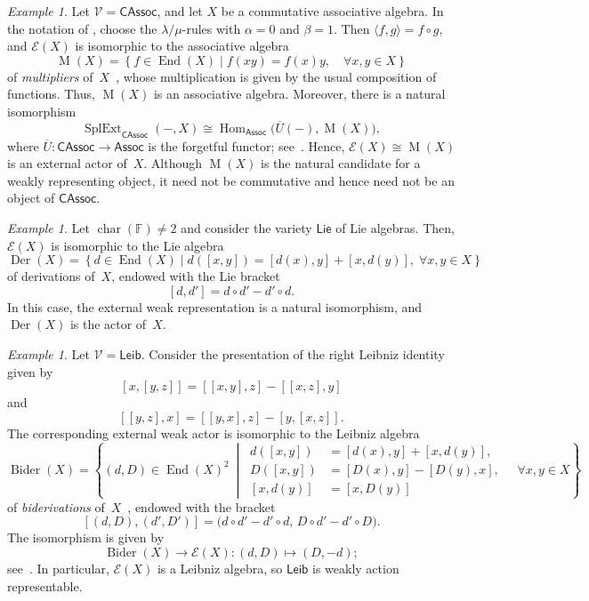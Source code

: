 \documentclass[reqno,a4paper]{amsart}
\theoremstyle{plain}
\theoremstyle{definition}
\theoremstyle{remark}
\newtheorem{example}[subsection]{Example}
\numberwithin{equation}{section}
\newcommand{\F}{\mathbb{F}}
\newcommand{\E}{\mathcal{E}}
\newcommand{\V}{\mathcal{V}}
\DeclareMathOperator{\bchar}{char}
\DeclareMathOperator{\Hom}{Hom}
\DeclareMathOperator{\SplExt}{SplExt}
\DeclareMathOperator{\End}{End}
\DeclareMathOperator{\Der}{Der}
\DeclareMathOperator{\Bider}{Bider}
\DeclareMathOperator{\M}{M}
\newcommand{\Assoc}{\ensuremath{\mathsf{Assoc}}}
\newcommand{\Lie}{\ensuremath{\mathsf{Lie}}}
\newcommand{\Leib}{\ensuremath{\mathsf{Leib}}}
\newcommand{\CAssoc}{\ensuremath{\mathsf{CAssoc}}}
\begin{document}
\begin{example}\label{ExampleExternalCAssoc}
Let $\V=\CAssoc$, and let $X$ be a commutative associative algebra. In the notation of , choose the $\lambda/\mu$-rules with $\alpha=0$ and $\beta=1$. Then $\langle f,g\rangle=f\circ g$, and $\E(X)$ is isomorphic to the associative algebra
\[
\operatorname{M}(X)
=
\left\{
f\in\End(X)
\mid
f(xy)=f(x)y, \quad \forall x,y\in X
\right\}
\]
of \emph{multipliers} of~$X$~\cite{Casas}, whose multiplication is given by the usual composition of functions. Thus, $\operatorname{M}(X)$ is an associative algebra. Moreover, there is a natural isomorphism
\[
\SplExt_{\CAssoc}(-,X)
\cong
\Hom_{\Assoc}\bigl(\overline{U}(-),\operatorname{M}(X)\bigr),
\]
where $\overline{U}\colon\CAssoc\to\Assoc$ is the forgetful functor; see~\cite[Proof of Theorem~2.6]{BJK2}. Hence, $\E(X)\cong\operatorname{M}(X)$ is an external actor of~$X$. Although $\M(X)$ is the natural candidate for a weakly representing object, it need not be commutative and hence need not be an object of $\CAssoc$.
\end{example}

\begin{example}\label{ExampleExternalLie}
Let $\bchar(\F) \neq 2$ and consider the variety $\Lie$ of Lie algebras. Then, $\E(X)$ is isomorphic to the Lie algebra
\[
\Der(X)=
\left\{
d\in\End(X)
\mid
d([x,y])=[d(x),y]+[x,d(y)], \; \forall x,y\in X
\right\}
\]
of derivations of~$X$, endowed with the Lie bracket
\[
[d,d']=d \circ d' - d' \circ d.
\]
In this case, the external weak representation is a natural isomorphism, and $\Der(X)$ is the actor of~$X$.
\end{example}

\begin{example}\label{ExampleExternalLeib}
Let $\V=\Leib$. Consider the presentation of the right Leibniz identity given by
\[
[x,[y,z]]=[[x,y],z]-[[x,z],y]
\]
and
\[
[[y,z],x]=[[y,x],z]-[y,[x,z]].
\]
The corresponding external weak actor is isomorphic to the Leibniz algebra
\[
\Bider(X)=
\left\{
(d,D)\in\End(X)^2
\ \middle|\
\begin{aligned}
d([x,y])&=[d(x),y]+[x,d(y)],\\
D([x,y])&=[D(x),y]-[D(y),x],\\
[x,d(y)]&=[x,D(y)]
\end{aligned}
\quad \forall x,y\in X
\right\}
\]
of \emph{biderivations} of~$X$~\cite{loday}, endowed with the bracket
\[
[(d,D),(d',D')]
=
\bigl(d\circ d'-d'\circ d,\,
D\circ d'-d'\circ D\bigr).
\]
The isomorphism is given by
\[
\Bider(X)\to\E(X)\colon(d,D)\mapsto(D,-d);
\]
see~\cite{Casas,CigoliManciniMetere}. In particular, $\E(X)$ is a Leibniz algebra, so $\Leib$ is weakly action representable.
\end{example}
\end{document}
